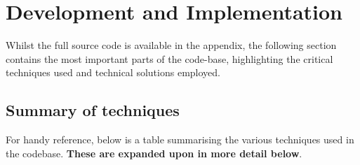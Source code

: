 \section{Development and Implementation}

Whilst the full source code is available in the appendix, the following section contains the most important parts of the code-base, highlighting the critical techniques used and technical solutions employed.

\subsection{Summary of techniques}
For handy reference, below is a table summarising the various techniques used in the codebase. \textbf{These are expanded upon in more detail below}.

